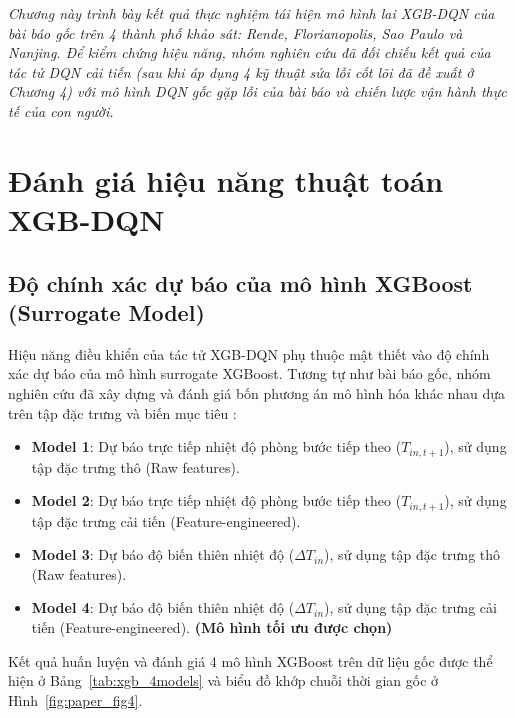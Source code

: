 \documentclass[12pt, a4paper]{report}
\begin{document}
\textit{Chương này trình bày kết quả thực nghiệm tái hiện mô hình lai XGB-DQN của bài báo gốc \cite{whulx} trên 4 thành phố khảo sát: Rende, Florianopolis, Sao Paulo và Nanjing. Để kiểm chứng hiệu năng, nhóm nghiên cứu đã đối chiếu kết quả của tác tử DQN cải tiến (sau khi áp dụng 4 kỹ thuật sửa lỗi cốt lõi đã đề xuất ở Chương 4) với mô hình DQN gốc gặp lỗi của bài báo và chiến lược vận hành thực tế của con người.}

\section{Đánh giá hiệu năng thuật toán XGB-DQN}

\subsection{Độ chính xác dự báo của mô hình XGBoost (Surrogate Model)}
Hiệu năng điều khiển của tác tử XGB-DQN phụ thuộc mật thiết vào độ chính xác dự báo của mô hình surrogate XGBoost. Tương tự như bài báo gốc, nhóm nghiên cứu đã xây dựng và đánh giá bốn phương án mô hình hóa khác nhau dựa trên tập đặc trưng và biến mục tiêu \cite{whulx}:
\begin{itemize}
    \item \textbf{Model 1}: Dự báo trực tiếp nhiệt độ phòng bước tiếp theo ($T_{in,t+1}$), sử dụng tập đặc trưng thô (Raw features).
    \item \textbf{Model 2}: Dự báo trực tiếp nhiệt độ phòng bước tiếp theo ($T_{in,t+1}$), sử dụng tập đặc trưng cải tiến (Feature-engineered).
    \item \textbf{Model 3}: Dự báo độ biến thiên nhiệt độ ($\Delta T_{in}$), sử dụng tập đặc trưng thô (Raw features).
    \item \textbf{Model 4}: Dự báo độ biến thiên nhiệt độ ($\Delta T_{in}$), sử dụng tập đặc trưng cải tiến (Feature-engineered). \textbf{(Mô hình tối ưu được chọn)}
\end{itemize}

Kết quả huấn luyện và đánh giá 4 mô hình XGBoost trên dữ liệu gốc được thể hiện ở Bảng~\ref{tab:xgb_4models} và biểu đồ khớp chuỗi thời gian gốc ở Hình~\ref{fig:paper_fig4}.
\end{document}
